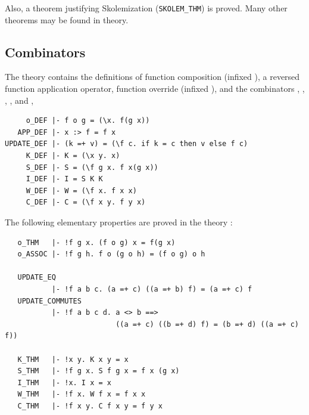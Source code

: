 Also, a theorem justifying Skolemization ({\small\verb+SKOLEM_THM+}) is
proved. Many other theorems may be found in  theory.


\subsection{Combinators}
\label{sec:combinTheory}


The theory 
%
%
contains the definitions of function composition (infixed ),
a reversed function application operator,
function override (infixed \ml{=+}),
and the combinators
,
,
,
,
and ,

\begin{hol}
\begin{verbatim}
     o_DEF |- f o g = (\x. f(g x))
   APP_DEF |- x :> f = f x
UPDATE_DEF |- (k =+ v) = (\f c. if k = c then v else f c)
     K_DEF |- K = (\x y. x)
     S_DEF |- S = (\f g x. f x(g x))
     I_DEF |- I = S K K
     W_DEF |- W = (\f x. f x x)
     C_DEF |- C = (\f x y. f y x)
\end{verbatim}
\end{hol}

\noindent The following elementary properties are proved in the theory
:

\begin{hol}
\begin{verbatim}
   o_THM   |- !f g x. (f o g) x = f(g x)
   o_ASSOC |- !f g h. f o (g o h) = (f o g) o h

   UPDATE_EQ
           |- !f a b c. (a =+ c) ((a =+ b) f) = (a =+ c) f
   UPDATE_COMMUTES
           |- !f a b c d. a <> b ==>
                          ((a =+ c) ((b =+ d) f) = (b =+ d) ((a =+ c) f))

   K_THM   |- !x y. K x y = x
   S_THM   |- !f g x. S f g x = f x (g x)
   I_THM   |- !x. I x = x
   W_THM   |- !f x. W f x = f x x
   C_THM   |- !f x y. C f x y = f y x
\end{verbatim}
\end{hol}

